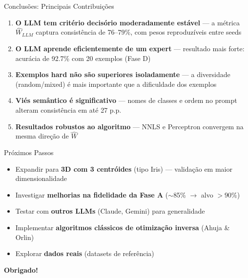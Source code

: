\documentclass[aspectratio=169,11pt]{beamer}
\begin{document}
\begin{frame}{Conclus\~oes: Principais Contribui\c{c}\~oes}
\begin{enumerate}
    \item \textbf{O LLM tem crit\'erio decis\'orio moderadamente est\'avel} --- a m\'etrica $\hat{W}_{LLM}$ captura consist\^encia de 76--79\%, com pesos reproduz\'iveis entre seeds

    \vspace{0.2cm}
    \item \textbf{O LLM aprende eficientemente de um expert} --- resultado mais forte: acur\'acia de 92.7\% com 20 exemplos (Fase D)

    \vspace{0.2cm}
    \item \textbf{Exemplos hard n\~ao s\~ao superiores isoladamente} --- a diversidade (random/mixed) \'e mais importante que a dificuldade dos exemplos

    \vspace{0.2cm}
    \item \textbf{Vi\'es sem\^antico \'e significativo} --- nomes de classes e ordem no prompt alteram consist\^encia em at\'e 27 p.p.

    \vspace{0.2cm}
    \item \textbf{Resultados robustos ao algoritmo} --- NNLS e Perceptron convergem na mesma dire\c{c}\~ao de $\hat{W}$
\end{enumerate}
\end{frame}

\begin{frame}{Pr\'oximos Passos}
\begin{itemize}
    \item Expandir para \textbf{3D com 3 centr\'oides} (tipo Iris) --- valida\c{c}\~ao em maior dimensionalidade
    \item Investigar \textbf{melhorias na fidelidade da Fase A} ($\sim$85\% $\to$ alvo $> 90\%$)
    \item Testar com \textbf{outros LLMs} (Claude, Gemini) para generalidade
    \item Implementar \textbf{algoritmos cl\'assicos de otimiza\c{c}\~ao inversa} (Ahuja \& Orlin)
    \item Explorar \textbf{dados reais} (datasets de refer\^encia)
\end{itemize}

\vspace{0.5cm}
\begin{center}
\Large\textbf{Obrigado!}
\end{center}
\end{frame}
\end{document}
